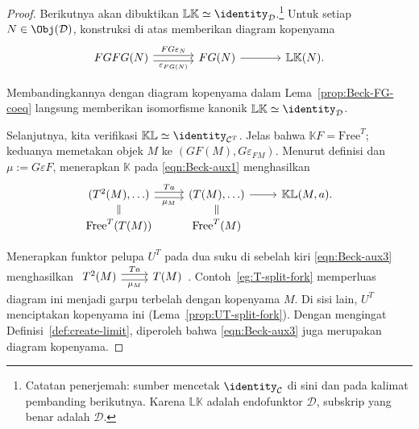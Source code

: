 \begin{proof}
	Berikutnya akan dibuktikan
	$\mathbb{L}\mathbb{K}\simeq\identity_{\mathcal{D}}$.\footnote{Catatan
	penerjemah: sumber mencetak $\identity_{\mathcal{C}}$ di sini dan pada
	kalimat pembanding berikutnya. Karena $\mathbb{L}\mathbb{K}$ adalah
	endofunktor $\mathcal{D}$, subskrip yang benar adalah $\mathcal{D}$.}
	Untuk setiap $N\in\Obj(\mathcal{D})$, konstruksi di atas memberikan diagram
	kopenyama
	\begin{equation*}\begin{tikzcd}[column sep=large]
		FGFG(N) \arrow[shift left, r, "FG\varepsilon_N"] \arrow[shift right, r, "\varepsilon_{FG(N)}"'] & FG(N) \arrow[r] & \mathbb{L}\mathbb{K}(N).
	\end{tikzcd}\end{equation*}

	Membandingkannya dengan diagram kopenyama dalam
	Lema~\ref{prop:Beck-FG-coeq} langsung memberikan isomorfisme kanonik
	$\mathbb{L}\mathbb{K}\simeq\identity_{\mathcal{D}}$.

	Selanjutnya, kita verifikasi
	$\mathbb{K}\mathbb{L}\simeq\identity_{\mathcal{C}^T}$. Jelas bahwa
	$\mathbb{K}F=\mathrm{Free}^T$; keduanya memetakan objek $M$ ke
	$(GF(M),G\varepsilon_{FM})$. Menurut definisi dan
	$\mu:=G\varepsilon F$, menerapkan $\mathbb{K}$ pada
	\eqref{eqn:Beck-aux1} menghasilkan
	\begin{equation}\label{eqn:Beck-aux3}
		\begin{tikzcd}[row sep=small]
			(T^2(M), \ldots) \arrow[shift left, r, "Ta"] \arrow[shift right, r, "\mu_M"'] & (T(M), \ldots) \arrow[r] & \mathbb{K}\mathbb{L}(M, a). \\
			\mathrm{Free}^T(T(M)) \arrow[equal, u] & \mathrm{Free}^T(M) \arrow[equal, u] &
		\end{tikzcd}
	\end{equation}

	Menerapkan funktor pelupa $U^T$ pada dua suku di sebelah kiri
	\eqref{eqn:Beck-aux3} menghasilkan
	$\begin{tikzcd}
		T^2(M) \arrow[shift left, r, "{Ta}"] \arrow[shift right, r, "{\mu_M}"'] & T(M)
	\end{tikzcd}$.
	Contoh~\ref{eg:T-split-fork} memperluas diagram ini menjadi garpu terbelah
	dengan kopenyama $M$. Di sisi lain, $U^T$ menciptakan kopenyama ini
	(Lema~\ref{prop:UT-split-fork}). Dengan mengingat
	Definisi~\ref{def:create-limit}, diperoleh bahwa \eqref{eqn:Beck-aux3} juga
	merupakan diagram kopenyama.


\end{proof}
